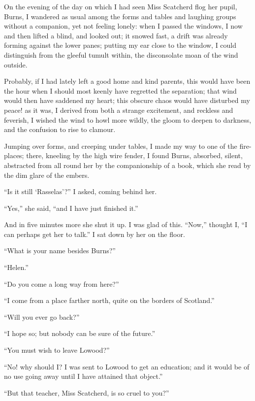 On the evening of the day on which I had seen Miss Scatcherd flog her
pupil, Burns, I wandered as usual among the forms and tables and
laughing groups without a companion, yet not feeling lonely: when I
passed the windows, I now and then lifted a blind, and looked out; it
snowed fast, a drift was already forming against the lower panes;
putting my ear close to the window, I could distinguish from the gleeful
tumult within, the disconsolate moan of the wind outside.

Probably, if I had lately left a good home and kind parents, this would
have been the hour when I should most keenly have regretted the
separation; that wind would then have saddened my heart; this obscure
chaos would have disturbed my peace! as it was, I derived from both a
strange excitement, and reckless and feverish, I wished the wind to howl
more wildly, the gloom to deepen to darkness, and the confusion to rise
to clamour.

Jumping over forms, and creeping under tables, I made my way to one of
the fire-places; there, kneeling by the high wire fender, I found Burns,
absorbed, silent, abstracted from all round her by the companionship of
a book, which she read by the dim glare of the embers.

\enquote{Is it still \enquote{Rasselas}?} I asked, coming behind her.

\enquote{Yes,} she said, \enquote{and I have just finished it.}

And in five minutes more she shut it up.  I was glad of this.
\enquote{Now,} thought I, \enquote{I can perhaps get her to talk.}  I
sat down by her on the floor.

\enquote{What is your name besides Burns?}

\enquote{Helen.}

\enquote{Do you come a long way from here?}

\enquote{I come from a place farther north, quite on the borders of
	Scotland.}

\enquote{Will you ever go back?}

\enquote{I hope so; but nobody can be sure of the future.}

\enquote{You must wish to leave Lowood?}

\enquote{No! why should I?  I was sent to Lowood to get an education;
	and it would be of no use going away until I have attained that object.}

\enquote{But that teacher, Miss Scatcherd, is so cruel to you?}

